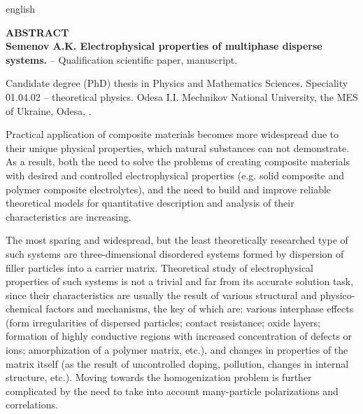 \begin{otherlanguage*}{english}
\begin{center}
    {\normalfont \textbf{
    	ABSTRACT\\
    	Semenov A.K. Electrophysical properties of multiphase disperse systems.} -- Qualification scientific paper, manuscript.}
\end{center}
\vskip 15pt

Candidate degree (PhD) thesis in Physics and Mathematics Sciences. Speciality 01.04.02 -- theoretical physics. Odesa I.I. Mechnikov National University, the MES of Ukraine, Odesa, \the\year.

\vskip 15pt

Practical application of composite materials becomes more widespread due to their unique physical properties, which natural substances can not demonstrate. As a result, both the need to solve the problems of creating composite materials with  desired and controlled electrophysical properties (e.g. solid composite and polymer composite electrolytes), and the need to build and improve reliable theoretical models for quantitative description and analysis of their characteristics are increasing.

The most sparing and widespread, but the least theoretically researched type of such systems are three-dimensional disordered systems formed by dispersion of filler particles into a carrier matrix. Theoretical study of electrophysical properties of such systems is not a trivial and far from its accurate solution task, since their characteristics are usually the result of various structural and physico-chemical factors and mechanisms, the key of which are: various interphase effects (form irregularities of dispersed particles; contact resistance; oxide layers; formation of highly conductive regions with increased concentration of defects or ions; amorphization of a polymer matrix, etc.), and changes in  properties of the matrix itself (as the result of uncontrolled doping, pollution, changes in internal structure, etc.). Moving towards the homogenization problem is further complicated by the need to take into account many-particle polarizations and correlations.


\end{otherlanguage*}
